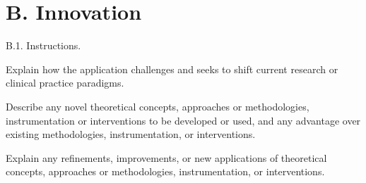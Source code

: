 \documentclass[master.tex]{subfiles}
\begin{document}
\section*{B. Innovation}

\begin{description}
\item[B.1. Instructions.]{}
\end{description}

Explain how the application challenges and seeks to shift current research or clinical practice paradigms.

Describe any novel theoretical concepts, approaches or methodologies, instrumentation or interventions to be developed or used, and any advantage over existing methodologies, instrumentation, or interventions.

Explain any refinements, improvements, or new applications of theoretical concepts, approaches or methodologies, instrumentation, or interventions.
\end{document}
